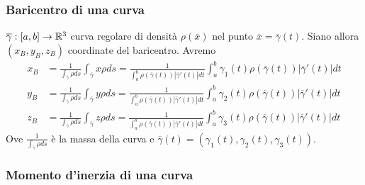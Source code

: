 	
\subsubsection{Baricentro  di una curva}
	
$\overline{\gamma}:[a,b]\rightarrow \mathbb{R}^3$ curva regolare di densità $\rho(\overline{x})$ nel punto $\overline{x}=\overline{\gamma}(t)$. Siano allora $(x_B,y_B,z_B)$ coordinate del baricentro. Avremo
\begin{align*}
	x_B&=\frac{1}{\int_{\overline{\gamma}}\rho ds}\int_{\overline{\gamma}}x\rho ds=\frac{1}{\int_a^b \rho(\overline{\gamma}(t))|\overline{\gamma}'(t)|dt}\int_a^b \gamma_1(t)\rho(\overline{\gamma}(t))|\overline{\gamma}'(t)|dt\\
	y_B&=\frac{1}{\int_{\overline{\gamma}}\rho ds}\int_{\overline{\gamma}}y \rho ds= \frac{1}{\int_a^b \rho(\overline{\gamma}(t))|\overline{\gamma}'(t)|dt}\int_a^b \gamma_2(t)\rho(\overline{\gamma}(t))|\overline{\gamma}'(t)|dt\\
	z_B&=\frac{1}{\int_{\overline{\gamma}}\rho ds}\int_{\overline{\gamma}}z \rho ds= \frac{1}{\int_a^b \rho(\overline{\gamma}(t))|\overline{\gamma}'(t)|dt}\int_a^b \gamma_3(t)\rho(\overline{\gamma}(t))|\overline{\gamma}'(t)|dt
\end{align*}
Ove $\frac{1}{\int_{\overline{\gamma}}\rho ds}$ è la massa della curva e $\overline{\gamma}(t)=(\gamma_1(t),\gamma_2(t),\gamma_3(t))$.


\subsubsection{Momento d'inerzia di una curva}
	
